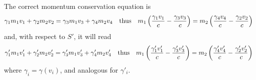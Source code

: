 \documentclass[oneside, 10pt, notitlepage]{book}
\begin{document}
The correct momentum conservation equation is
\begin{equation}\label{eq:momconsrel}
    \gamma_1 m_1 v_1 + \gamma_2 m_2 v_2 = \gamma_3 m_1 v_3 + \gamma_4 m_2 v_4 \qq{thus} m_1 \lr{\frac{\gamma_1 v_1}{c}-\frac{\gamma_3 v_3}{c}} = m_2 \lr{\frac{\gamma_4 v_4}{c}-\frac{\gamma_2 v_2}{c}}
\end{equation}
and, with respect to \(S'\), it will read
\begin{equation}\label{eq:momconsprimerel}
    \gamma'_1 m_1 v'_1 + \gamma'_2m_2 v'_2 = \gamma'_3m_1 v'_3 + \gamma'_4m_2 v'_4 \qq{thus} m_1 \lr{\frac{\gamma'_1v'_1}{c}-\frac{\gamma'_3v'_3}{c}} = m_2 \lr{\frac{\gamma'_4v'_4}{c}-\frac{\gamma'_2v'_2}{c}}
\end{equation}
where \(\gamma_i = \gamma (v_i)\), and analogous for \(\gamma'_i\).
\end{document}
